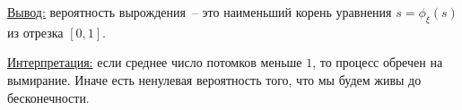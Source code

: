\underline{Вывод:} вероятность вырождения~-- это наименьший корень уравнения $s = \phi_\xi(s)$
из отрезка $[0, 1]$.

\underline{Интерпретация:} если среднее число потомков меньше $1$, то процесс обречен на вымирание.
Иначе есть ненулевая вероятность того, что мы будем живы до бесконечности.


\ifdefined\Main\else

\fi
